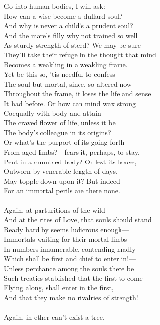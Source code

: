 Go into human bodies, I will ask:\\
How can a wise become a dullard soul?\\
And why is never a child's a prudent soul?\\
And the mare's filly why not trained so well\\
As sturdy strength of steed? We may be sure\\
They'll take their refuge in the thought that mind\\
Becomes a weakling in a weakling frame.\\
Yet be this so, 'tis needful to confess\\
The soul but mortal, since, so altered now\\
Throughout the frame, it loses the life and sense\\
It had before. Or how can mind wax strong\\
Coequally with body and attain\\
The craved flower of life, unless it be\\
The body's colleague in its origins?\\
Or what's the purport of its going forth\\
From aged limbs?—fears it, perhaps, to stay,\\
Pent in a crumbled body? Or lest its house,\\
Outworn by venerable length of days,\\
May topple down upon it? But indeed\\
For an immortal perils are there none.\\
\\
Again, at parturitions of the wild\\
And at the rites of Love, that souls should stand\\
Ready hard by seems ludicrous enough—\\
Immortals waiting for their mortal limbs\\
In numbers innumerable, contending madly\\
Which shall be first and chief to enter in!—\\
Unless perchance among the souls there be\\
Such treaties stablished that the first to come\\
Flying along, shall enter in the first,\\
And that they make no rivalries of strength!\\
\\
Again, in ether can't exist a tree,\\
